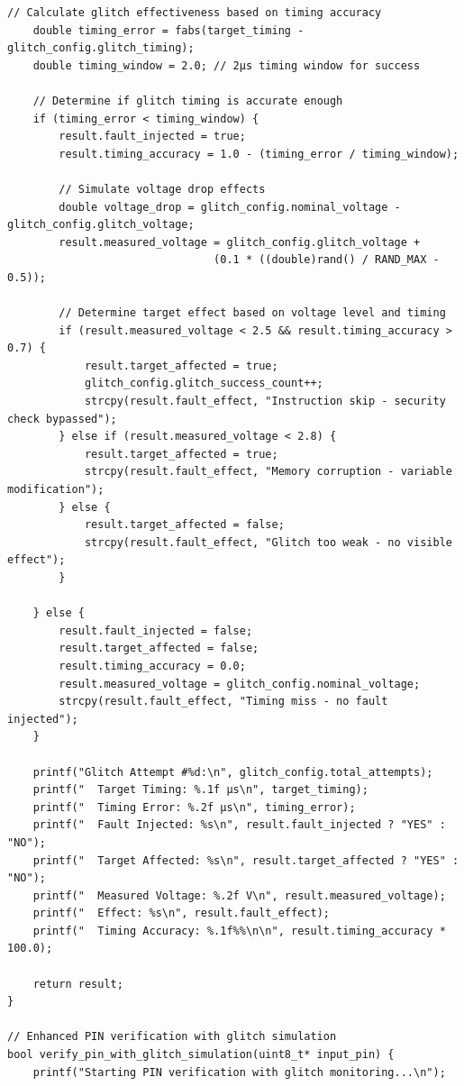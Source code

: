 \documentclass[12pt,a4paper]{article}
\begin{document}
\begin{lstlisting}[caption={Complete Voltage Glitching Attack System}]
    // Calculate glitch effectiveness based on timing accuracy
    double timing_error = fabs(target_timing - glitch_config.glitch_timing);
    double timing_window = 2.0; // 2μs timing window for success
    
    // Determine if glitch timing is accurate enough
    if (timing_error < timing_window) {
        result.fault_injected = true;
        result.timing_accuracy = 1.0 - (timing_error / timing_window);
        
        // Simulate voltage drop effects
        double voltage_drop = glitch_config.nominal_voltage - glitch_config.glitch_voltage;
        result.measured_voltage = glitch_config.glitch_voltage + 
                                (0.1 * ((double)rand() / RAND_MAX - 0.5));
        
        // Determine target effect based on voltage level and timing
        if (result.measured_voltage < 2.5 && result.timing_accuracy > 0.7) {
            result.target_affected = true;
            glitch_config.glitch_success_count++;
            strcpy(result.fault_effect, "Instruction skip - security check bypassed");
        } else if (result.measured_voltage < 2.8) {
            result.target_affected = true;
            strcpy(result.fault_effect, "Memory corruption - variable modification");  
        } else {
            result.target_affected = false;
            strcpy(result.fault_effect, "Glitch too weak - no visible effect");
        }
        
    } else {
        result.fault_injected = false;
        result.target_affected = false;
        result.timing_accuracy = 0.0;
        result.measured_voltage = glitch_config.nominal_voltage;
        strcpy(result.fault_effect, "Timing miss - no fault injected");
    }
    
    printf("Glitch Attempt #%d:\n", glitch_config.total_attempts);
    printf("  Target Timing: %.1f μs\n", target_timing);
    printf("  Timing Error: %.2f μs\n", timing_error);
    printf("  Fault Injected: %s\n", result.fault_injected ? "YES" : "NO");
    printf("  Target Affected: %s\n", result.target_affected ? "YES" : "NO");
    printf("  Measured Voltage: %.2f V\n", result.measured_voltage);
    printf("  Effect: %s\n", result.fault_effect);
    printf("  Timing Accuracy: %.1f%%\n\n", result.timing_accuracy * 100.0);
    
    return result;
}

// Enhanced PIN verification with glitch simulation
bool verify_pin_with_glitch_simulation(uint8_t* input_pin) {
    printf("Starting PIN verification with glitch monitoring...\n");
    

\end{lstlisting}
\end{document}
